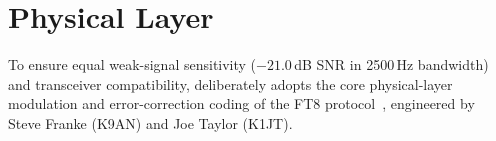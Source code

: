 %
%
%
%
%
%


\section{Physical Layer}
\label{sec:phy}

To ensure equal weak-signal sensitivity ($-21.0$\,dB SNR in 2500\,Hz bandwidth) and transceiver compatibility,  deliberately adopts the core physical-layer modulation and error-correction coding of the FT8 protocol~\cite{ft8}, engineered by Steve Franke (K9AN) and Joe Taylor (K1JT).

